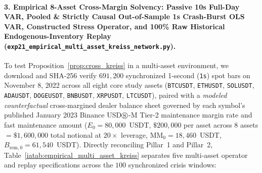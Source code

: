 \documentclass[12pt]{article}
\theoremstyle{definition}
\theoremstyle{remark}
\begin{document}
\paragraph{3. Empirical 8-Asset Cross-Margin Solvency: Passive 10s Full-Day VAR, Pooled \& Strictly Causal Out-of-Sample 1s Crash-Burst OLS VAR, Constructed Stress Operator, and 100\% Raw Historical Endogenous-Inventory Replay (\nolinkurl{exp21_empirical_multi_asset_kreiss_network.py}).}
To test Proposition~\ref{prop:cross_kreiss} in a multi-asset environment, we download and SHA-256 verify $691{,}200$ synchronized 1-second (\texttt{1s}) spot bars on November 8, 2022 across all eight core study assets (\texttt{BTCUSDT}, \texttt{ETHUSDT}, \texttt{SOLUSDT}, \texttt{ADAUSDT}, \texttt{DOGEUSDT}, \texttt{BNBUSDT}, \texttt{XRPUSDT}, \texttt{LTCUSDT}), paired with a \emph{modeled counterfactual} cross-margined dealer balance sheet governed by each symbol's published January 2023 Binance USD$\circledS$-M Tier-2 maintenance margin rate and fast maintenance amount ($E_0 = 80{,}000$~USDT, $\$200{,}000$ per asset across $8$ assets $= \$1{,}600{,}000$ total notional at $20\times$ leverage, $\mathrm{MM}_0 = 18{,}460$~USDT, $B_{\mathrm{rem},0} = 61{,}540$~USDT). Directly reconciling Pillar~1 and Pillar~2, Table~\ref{iatab:empirical_multi_asset_kreiss} separates five multi-asset operator and replay specifications across the $100$ synchronized crisis windows:
\end{document}
